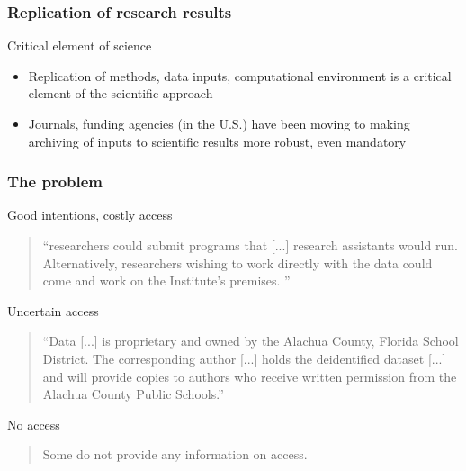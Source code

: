 \begin{frame}
	\frametitle{Replication of research results}
	\begin{block}{Critical element of science}
		\begin{itemize}
			\item Replication of methods, data inputs, computational environment is a critical element of the scientific approach
			\item Journals, funding agencies (in the U.S.) have been moving to making archiving of inputs to scientific results more robust, even mandatory
		\end{itemize}
	\end{block}
\end{frame}


\begin{frame}
\frametitle{The problem}
\begin{block}{Good intentions, costly access}
\begin{quote}
	``researchers could submit programs that [...] research assistants
	would run. Alternatively, researchers wishing to work directly with the data could come and
	work on the Institute's premises. ''
\end{quote}
\end{block}
\pause
\begin{block}{Uncertain access}
\begin{quote}
	``Data [...] is proprietary and owned by the Alachua
County, Florida School District. The corresponding author [...] holds the deidentified
dataset [...] and will provide copies to
authors who receive written permission from the Alachua County Public Schools.''
\end{quote}
\end{block}
\pause
\begin{block}{No access}
\begin{quote}
	Some do not provide any information on access.	
\end{quote}
\end{block}
\end{frame}




